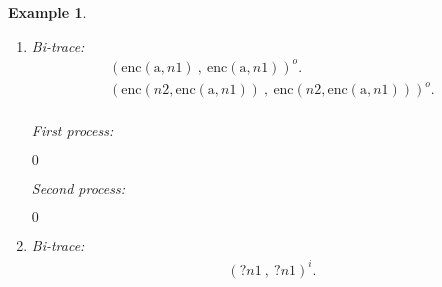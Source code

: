 \documentclass{article}
\newenvironment{example}{\begin{exa} \rm}{\end{exa}}
\newtheorem{exa}[theorem]{Example}
\begin{document}
\begin{example}
\begin{enumerate}
First process: 
\begin{tabbing}${\mathrm{a}}(n1).$ \\ 
$\nu$ \= $(n2).$ \\ 
$\overline{{\mathrm{a}}}~\langle ~\mbox{enc}(n1,n2) ~ \rangle.$ \\ 
$\nu$ \= $(n3).$ \\ 
$\overline{{\mathrm{a}}}~\langle ~\mbox{enc}(n3,\mbox{enc}({\mathrm{a}},n2)) ~ \rangle.$ \\ 
$\overline{n3}~\langle ~{\mathrm{a}} ~ \rangle.$ \\ 
$0$ \\ 
\end{tabbing}
Second process: 
\begin{tabbing}${\mathrm{a}}(n1).$ \\ 
$\nu$ \= $(n2).$ \\ 
$\overline{{\mathrm{a}}}~\langle ~\mbox{enc}(n1,n2) ~ \rangle.$ \\ 
$\nu$ \= $(n3).$ \\ 
$\overline{{\mathrm{a}}}~\langle ~\mbox{enc}(n3,\mbox{enc}({\mathrm{a}},n2)) ~ \rangle.$ \\ 
${[n1 = {\mathrm{a}} ]}$ \\ 
$\overline{n3}~\langle ~{\mathrm{a}} ~ \rangle.$ \\ 
$0$ \\ 
\end{tabbing}
\item 
Bi-trace: 
$$
\begin{array}{l}
(\mbox{enc}({\mathrm{a}},n1)~ , ~ \mbox{enc}({\mathrm{a}},n1))^o. \\ 
(\mbox{enc}(n2,\mbox{enc}({\mathrm{a}},n1))~ , ~ \mbox{enc}(n2,\mbox{enc}({\mathrm{a}},n1)))^o. \\ 
\end{array}
$$



First process: 
\begin{tabbing}$0$ \\ 
\end{tabbing}
Second process: 
\begin{tabbing}$0$ \\ 
\end{tabbing}
\item 
Bi-trace: 
$$
\begin{array}{l}
(?n1~ , ~ ?n1)^i. \\ 
\end{array}
$$




\end{enumerate}
\end{example}
\end{document}
